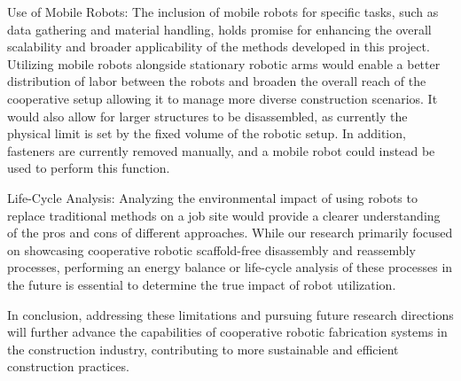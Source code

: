     Use of Mobile Robots: The inclusion of mobile robots for specific tasks, such as data gathering and material handling, holds promise for enhancing the overall scalability and broader applicability of the methods developed in this project. Utilizing mobile robots alongside stationary robotic arms would enable a better distribution of labor between the robots and broaden the overall reach of the cooperative setup allowing it to manage more diverse construction scenarios. It would also allow for larger structures to be disassembled, as currently the physical limit is set by the fixed volume of the robotic setup. In addition, fasteners are currently removed manually, and a mobile robot could instead be used to perform this function.

    Life-Cycle Analysis: Analyzing the environmental impact of using robots to replace traditional methods on a job site would provide a clearer understanding of the pros and cons of different approaches. While our research primarily focused on showcasing cooperative robotic scaffold-free disassembly and reassembly processes, performing an energy balance or life-cycle analysis of these processes in the future is essential to determine the true impact of robot utilization.

    In conclusion, addressing these limitations and pursuing future research directions will further advance the capabilities of cooperative robotic fabrication systems in the construction industry, contributing to more sustainable and efficient construction practices.

    
\newpage
 

\begingroup
    \hypersetup{hidelinks}
    
\endgroup